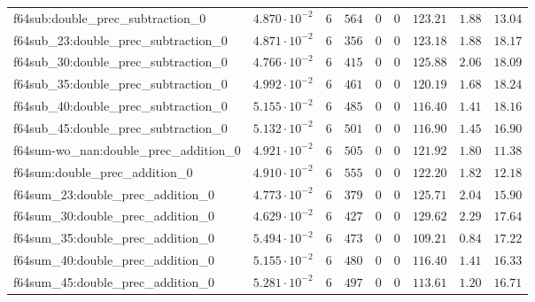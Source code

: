 \begin{tabular}{|l|c|c|c|c|c|c|c|c|}
f64sub:double\_prec\_subtraction\_0            & $ 4.870 \cdot 10^{-2} $ & $ 6      $ & $ 564   $ & $ 0   $ & $ 0      $ & $ 123.21      $ & $ 1.88    $ & $ 13.04   $ \\
f64sub\_23:double\_prec\_subtraction\_0        & $ 4.871 \cdot 10^{-2} $ & $ 6      $ & $ 356   $ & $ 0   $ & $ 0      $ & $ 123.18      $ & $ 1.88    $ & $ 18.17   $ \\
f64sub\_30:double\_prec\_subtraction\_0        & $ 4.766 \cdot 10^{-2} $ & $ 6      $ & $ 415   $ & $ 0   $ & $ 0      $ & $ 125.88      $ & $ 2.06    $ & $ 18.09   $ \\
f64sub\_35:double\_prec\_subtraction\_0        & $ 4.992 \cdot 10^{-2} $ & $ 6      $ & $ 461   $ & $ 0   $ & $ 0      $ & $ 120.19      $ & $ 1.68    $ & $ 18.24   $ \\
f64sub\_40:double\_prec\_subtraction\_0        & $ 5.155 \cdot 10^{-2} $ & $ 6      $ & $ 485   $ & $ 0   $ & $ 0      $ & $ 116.40      $ & $ 1.41    $ & $ 18.16   $ \\
f64sub\_45:double\_prec\_subtraction\_0        & $ 5.132 \cdot 10^{-2} $ & $ 6      $ & $ 501   $ & $ 0   $ & $ 0      $ & $ 116.90      $ & $ 1.45    $ & $ 16.90   $ \\
f64sum-wo\_nan:double\_prec\_addition\_0       & $ 4.921 \cdot 10^{-2} $ & $ 6      $ & $ 505   $ & $ 0   $ & $ 0      $ & $ 121.92      $ & $ 1.80    $ & $ 11.38   $ \\
f64sum:double\_prec\_addition\_0               & $ 4.910 \cdot 10^{-2} $ & $ 6      $ & $ 555   $ & $ 0   $ & $ 0      $ & $ 122.20      $ & $ 1.82    $ & $ 12.18   $ \\
f64sum\_23:double\_prec\_addition\_0           & $ 4.773 \cdot 10^{-2} $ & $ 6      $ & $ 379   $ & $ 0   $ & $ 0      $ & $ 125.71      $ & $ 2.04    $ & $ 15.90   $ \\
f64sum\_30:double\_prec\_addition\_0           & $ 4.629 \cdot 10^{-2} $ & $ 6      $ & $ 427   $ & $ 0   $ & $ 0      $ & $ 129.62      $ & $ 2.29    $ & $ 17.64   $ \\
f64sum\_35:double\_prec\_addition\_0           & $ 5.494 \cdot 10^{-2} $ & $ 6      $ & $ 473   $ & $ 0   $ & $ 0      $ & $ 109.21      $ & $ 0.84    $ & $ 17.22   $ \\
f64sum\_40:double\_prec\_addition\_0           & $ 5.155 \cdot 10^{-2} $ & $ 6      $ & $ 480   $ & $ 0   $ & $ 0      $ & $ 116.40      $ & $ 1.41    $ & $ 16.33   $ \\
f64sum\_45:double\_prec\_addition\_0           & $ 5.281 \cdot 10^{-2} $ & $ 6      $ & $ 497   $ & $ 0   $ & $ 0      $ & $ 113.61      $ & $ 1.20    $ & $ 16.71   $ \\

\end{tabular}
